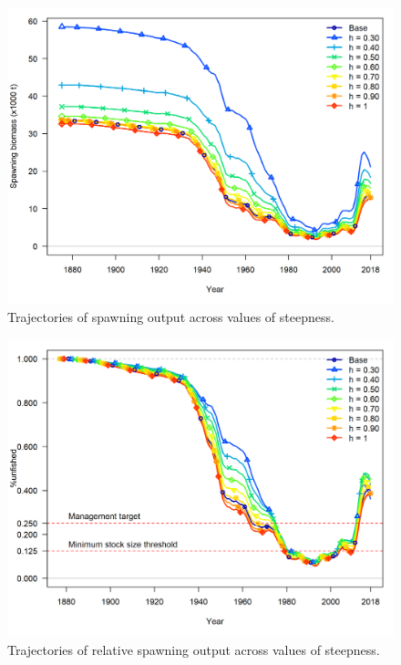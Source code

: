 \documentclass[12pt,]{article}
\begin{document}
\FloatBarrier

\begin{figure}
\centering
\includegraphics{Figures/h_trajectories_ssb.png}
\caption{Trajectories of spawning output across values of steepness.
\label{fig:h_ssb_trajectory}}
\end{figure}

\FloatBarrier

\begin{figure}
\centering
\includegraphics{Figures/h_trajectories_depl.png}
\caption{Trajectories of relative spawning output across values of
steepness. \label{fig:h_depl_trajectory}}
\end{figure}
\end{document}
